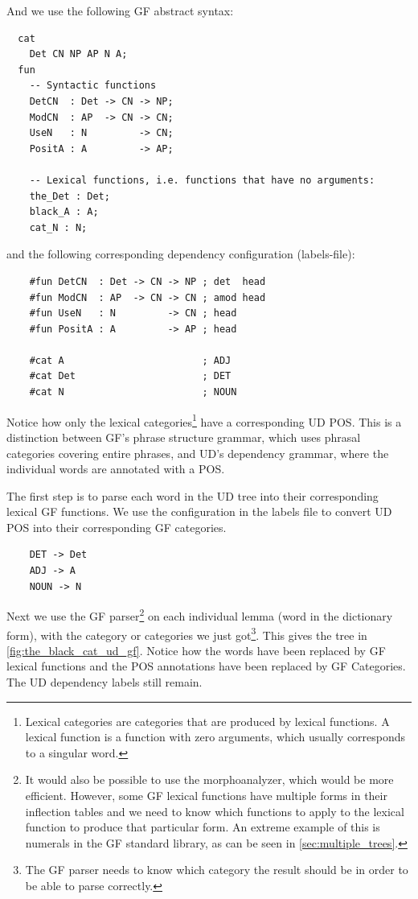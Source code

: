 And we use the following \ac{GF} abstract syntax:

\begin{verbatim}
  cat
    Det CN NP AP N A;
  fun
    -- Syntactic functions
    DetCN  : Det -> CN -> NP;
    ModCN  : AP  -> CN -> CN;
    UseN   : N         -> CN;
    PositA : A         -> AP;

    -- Lexical functions, i.e. functions that have no arguments:
    the_Det : Det;
    black_A : A;
    cat_N : N;
\end{verbatim}
and the following corresponding dependency configuration (labels-file):
\begin{verbatim}
    #fun DetCN  : Det -> CN -> NP ; det  head
    #fun ModCN  : AP  -> CN -> CN ; amod head
    #fun UseN   : N         -> CN ; head
    #fun PositA : A         -> AP ; head
    
    #cat A                        ; ADJ
    #cat Det                      ; DET
    #cat N                        ; NOUN
\end{verbatim}

Notice how only the lexical categories\footnote{Lexical categories are categories that are produced by lexical functions. A lexical function is a function with zero arguments, which usually corresponds to a singular word.} have a corresponding \ac{UD} \ac{POS}. This is a distinction between \ac{GF}'s phrase structure grammar, which uses phrasal categories covering entire phrases, and \ac{UD}'s dependency grammar, where the individual words are annotated with a \ac{POS}.

The first step is to parse each word in the \ac{UD} tree into their corresponding lexical \ac{GF} functions. We use the configuration in the labels file to convert \ac{UD} \ac{POS} into their corresponding \ac{GF} categories.
\begin{verbatim}
    DET -> Det
    ADJ -> A
    NOUN -> N
\end{verbatim}
Next we use the \ac{GF} parser\footnote{It would also be possible to use the morphoanalyzer, which would be more efficient. However, some \ac{GF} lexical functions have multiple forms in their inflection tables and we need to know which functions to apply to the lexical function to produce that particular form. An extreme example of this is numerals in the \ac{GF} standard library, as can be seen in \autoref{sec:multiple_trees}.} on each individual lemma (word in the dictionary form), with the category or categories we just got\footnote{The \ac{GF} parser needs to know which category the result should be in order to be able to parse correctly.}. %
This gives the tree in \autoref{fig:the_black_cat_ud_gf}. Notice how the words have been replaced by \ac{GF} lexical functions and the \ac{POS} annotations have been replaced by \ac{GF} Categories. The \ac{UD} dependency labels still remain.

